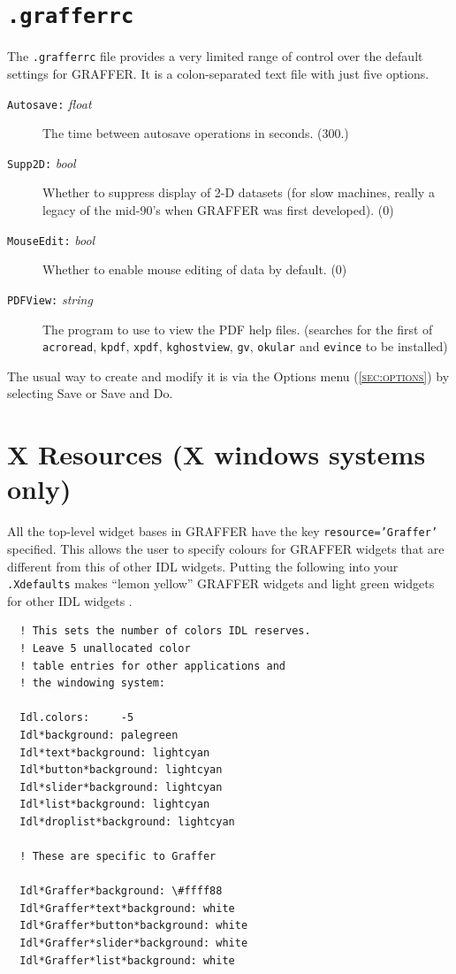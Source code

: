 \documentclass[11pt,twoside,english]{article}
\begin{document}
\section{\texttt{.grafferrc}}
\label{sec:grafferrc}

The \texttt{.grafferrc} file provides a very limited range of control
over the default settings for GRAFFER. It is a colon-separated text
file with just five options.
\begin{description}
\item[\texttt{Autosave:} \textit{float}] The time between autosave
  operations in seconds. (300.)
\item[\texttt{Supp2D:} \textit{bool}] Whether to suppress display of
  2-D datasets (for slow machines, really a legacy of the
  mid-90's when GRAFFER was first developed). (0)
\item[\texttt{MouseEdit:} \textit{bool}] Whether to enable mouse
  editing of data by default. (0)
\item[\texttt{PDFView:} \textit{string}] The program to use to view the
  PDF help files. (searches for the first of \texttt{acroread},
  \texttt{kpdf}, \texttt{xpdf}, \texttt{kghostview}, \texttt{gv},
  \texttt{okular} and \texttt{evince} to be installed)
\end{description}
The usual way to create and modify it is via the \textsf{Options} menu
(\textsc{\autoref{sec:options}}) by selecting \textsf{Save} or \textsf{Save
  and Do}.

\section{X Resources (X windows systems only)}

All the top-level widget bases in GRAFFER have the key
\texttt{resource='Graffer'} specified. This allows the user to specify
colours for GRAFFER widgets that are different from this of other IDL
widgets. Putting the following into your \texttt{.Xdefaults} makes
{}``lemon yellow'' GRAFFER widgets and light green widgets for other
IDL widgets .

\begin{verbatim}
  ! This sets the number of colors IDL reserves.
  ! Leave 5 unallocated color
  ! table entries for other applications and 
  ! the windowing system:

  Idl.colors:     -5
  Idl*background: palegreen
  Idl*text*background: lightcyan
  Idl*button*background: lightcyan
  Idl*slider*background: lightcyan
  Idl*list*background: lightcyan
  Idl*droplist*background: lightcyan

  ! These are specific to Graffer

  Idl*Graffer*background: \#ffff88
  Idl*Graffer*text*background: white
  Idl*Graffer*button*background: white
  Idl*Graffer*slider*background: white
  Idl*Graffer*list*background: white
\end{verbatim}
\end{document}

